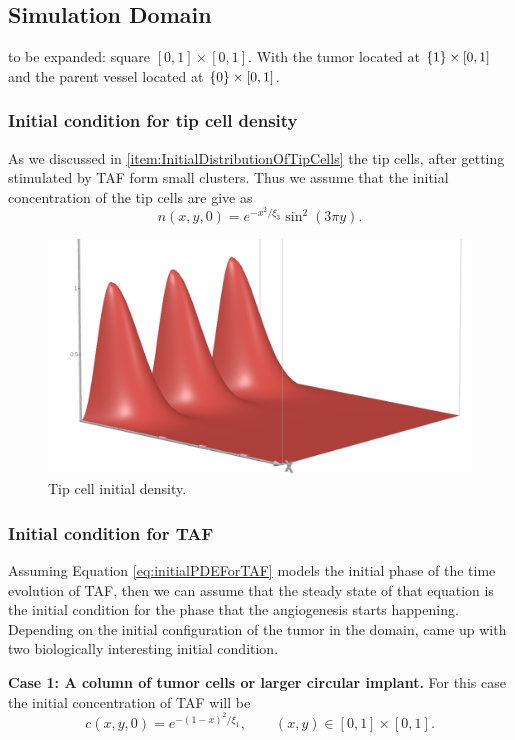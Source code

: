 \subsection{Simulation Domain}
to be expanded: square $ [0,1]\times [0,1] $. With the tumor located at $\{1\} \times [0,1] $ and the parent vessel located at $ \{0\} \times [0,1] $.

\subsubsection{Initial condition for tip cell density}
As we discussed in \autoref{item:InitialDistributionOfTipCells} the tip cells, after getting stimulated by TAF form small clusters. Thus we assume that the initial concentration of the tip cells are give as
\[ n(x,y,0) = e^{-x^2/\xi_3} \sin^2(3\pi y). \]
\begin{figure}[!ht]
	\centering
	\includegraphics[width=0.4\linewidth]{images/tipCellInitialDensity}
	\caption{Tip cell initial density.}
	\label{fig:tipcellinitialdensity}
\end{figure}


\subsubsection{Initial condition for TAF}
Assuming Equation \autoref{eq:initialPDEForTAF} models the initial phase of the time evolution of TAF, then we can assume that the steady state of that equation is the initial condition for the phase that the angiogenesis starts happening. Depending on the initial configuration of the tumor in the domain, \cite{Anderson1998} came up with two biologically interesting initial condition. 

\textbf{Case 1: A column of tumor cells or larger circular implant.} For this case the initial concentration of TAF will be
\[ c(x,y,0) = e^{-(1-x)^2/\xi_1}, \qquad (x,y) \in [0,1] \times [0,1]. \]

